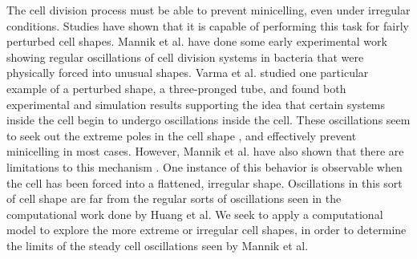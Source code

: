 \documentclass[letterpaper,twocolumn,amsmath,amssymb,pre]{revtex4-1}
\newcommand{\red}[1]{{\bf \color{red} #1}}
\newcommand{\fixme}[1]{\red{[#1]}}
\begin{document}
The cell division process must be able to prevent minicelling, even
under irregular conditions. Studies have shown that it is capable of
performing this task for fairly perturbed cell
shapes\cite{touhami2006temperature}. Mannik et al. have done some
early experimental work showing regular oscillations of cell division
systems in bacteria that were physically forced into unusual
shapes. Varma et al. studied one particular example of a perturbed
shape, a three-pronged tube, and found both experimental and
simulation results\cite{varma2008min} supporting the idea that certain
systems inside the cell begin to undergo oscillations inside the
cell. These oscillations seem to seek out the extreme poles in the
cell shape\cite{corbin2002exploring} \cite{juarez2010changes}, and
effectively prevent minicelling in most cases. However, Mannik et
al. have also shown that there are limitations to this
mechanism\cite{mannik2010bacteria} \cite{mannik2009bacterial}. One
instance of this behavior is observable when the cell has been forced
into a flattened, irregular shape. Oscillations in this sort of cell
shape are far from the regular sorts of oscillations seen in the
computational work done by Huang et al\cite{huang2003dynamic}. We seek
to apply a computational model to explore the more extreme or
irregular cell shapes, in order to determine the limits of the steady
cell oscillations seen by Mannik et al.

\end{document}
